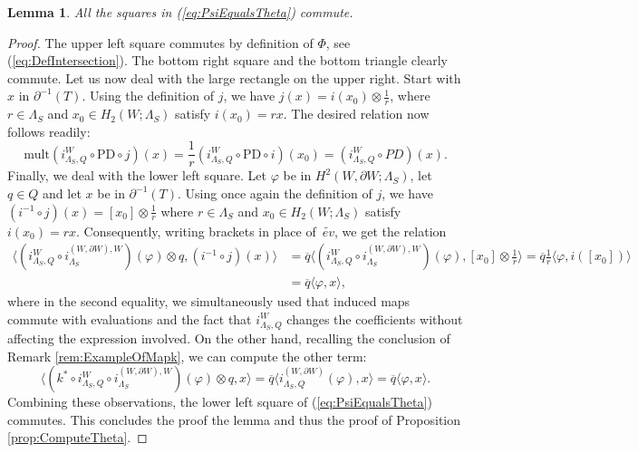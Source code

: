 \documentclass[11pt,a4paper]{amsart}
\newtheorem{lemma}[theorem]{Lemma}
\theoremstyle{definition}
\DeclareMathOperator{\ev}{ev}
\begin{document}
\begin{lemma}
\label{lem:AllCommute}
All the squares in (\ref{eq:PsiEqualsTheta}) commute.
\end{lemma}
\begin{proof}
The upper left square commutes by definition of $\Phi$, see (\ref{eq:DefIntersection}). 
The bottom right square and the bottom triangle clearly commute. 
Let us now deal with the large rectangle on the upper right. Start with $x$ in $\partial^{-1}(T)$. 
Using the definition of $j$, we have $j(x)=i(x_0) \otimes \frac{1}{r}$, where $r \in \Lambda_S$ and $x_0 \in H_2(W;\Lambda_S)$ satisfy $i(x_0)=r x$. The desired relation now follows readily:
$$\text{mult}(i^W_{\Lambda_S,Q} \circ \text{PD}  \circ j)(x)=\frac{1}{r} (i^W_{\Lambda_S,Q} \circ \text{PD} \circ i)(x_0)=(i^W_{\Lambda_S,Q} \circ PD)(x).$$
Finally, we deal with the lower left square. 
Let $\varphi$ be in $H^2(W,\partial W;\Lambda_S)$, let $q \in Q$ and let $x$ be in $\partial^{-1}(T)$. 
Using once again the definition of $j$, we have $(i^{-1}\circ j)(x)=[x_0]\otimes \frac{1}{r}$ where $r \in \Lambda_S$ and $x_0 \in H_2(W;\Lambda_S)$ satisfy $i(x_0)=r x$. Consequently, writing brackets in place of~$\widetilde{ev}$, we get the relation
\begin{align*}
 \langle  (i^W_{\Lambda_S,Q} \circ  i_{\Lambda_S}^{(W,\partial W),W})(\varphi) \otimes q , (i^{-1} \circ j)(x) \rangle 
&=\overline{q}  \langle  (i^W_{\Lambda_S,Q} \circ  i_{\Lambda_S}^{(W,\partial W),W})(\varphi) , [x_0] \otimes \frac{1}{r} \rangle
=\overline{q} \frac{1}{r} \langle  \varphi , i ([x_0]) \rangle \\
&=\overline{q}\langle \varphi,x \rangle,
\end{align*}
where in the second equality, we simultaneously used that induced maps commute with evaluations and the fact that $i_{\Lambda_S,Q}^W$ changes the coefficients without affecting the expression involved. 
On the other hand, recalling the conclusion of Remark \ref{rem:ExampleOfMapk}, we can compute the other term:
$$ \langle (k^* \circ i^W_{\Lambda_S,Q} \circ  i_{\Lambda_S}^{(W,\partial W),W})(\varphi) \otimes q , x\rangle
=\overline{q}\langle i_{\Lambda_S,Q}^{(W,\partial W)}(\varphi), x \rangle
=\overline{q} \langle  \varphi ,  x \rangle.$$
Combining these observations, the lower left square of (\ref{eq:PsiEqualsTheta}) commutes. This concludes the proof the lemma and thus the proof of Proposition \ref{prop:ComputeTheta}.
\end{proof}
\end{document}
